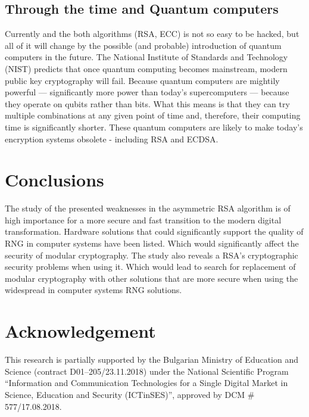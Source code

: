 \documentclass[runningheads]{llncs}
\begin{document}
\subsection{Through the time and Quantum computers}
\label{sub-sec:6-3}

Currently and the both algorithms (RSA, ECC) is not so easy to be hacked, but all of it will change by the possible (and probable) introduction of quantum computers in the future. The National Institute of Standards and Technology (NIST) predicts that once quantum computing becomes mainstream, modern public key cryptography will fail. Because quantum computers are mightily powerful — significantly more power than today’s supercomputers — because they operate on qubits rather than bits. What this means is that they can try multiple combinations at any given point of time and, therefore, their computing time is significantly shorter. These quantum computers are likely to make today’s encryption systems obsolete - including RSA and ECDSA.

\section{Conclusions}
\label{sec:7}

The study of the presented weaknesses in the asymmetric RSA algorithm is of high importance for a more secure and fast transition to the modern digital transformation. Hardware solutions that could significantly support the quality of RNG in computer systems have been listed. Which would significantly affect the security of modular cryptography. The study also reveals a RSA's cryptographic security problems when using it. Which would lead to search for replacement of modular cryptography with other solutions that are more secure when using the widespread in computer systems RNG solutions.

\section*{Acknowledgement}
This research is partially supported by the Bulgarian Ministry of Education and Science (contract D01–205/23.11.2018) under the National Scientific Program ``Information and Communication Technologies for a Single Digital Market in Science, Education and Security (ICTinSES)'', approved by DCM \# 577/17.08.2018.
\end{document}
